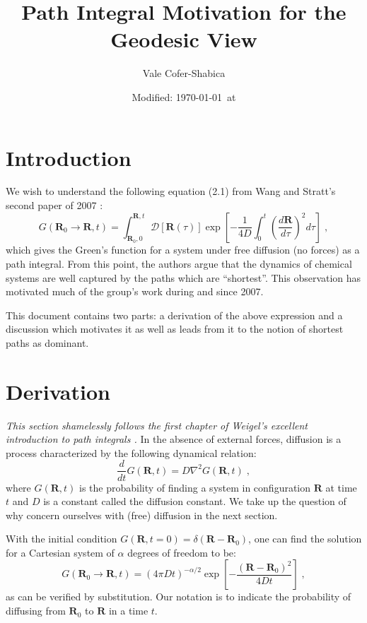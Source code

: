 \documentclass[letterpaper,12pt]{article}
\title{Path Integral Motivation for the Geodesic View}
\date{Modified: \today\ at \currenttime}
\author{Vale Cofer-Shabica}
\renewcommand{\vec}[1]{\mathbf{#1}}
\begin{document}
\maketitle


\section*{Introduction}
We wish to understand the following equation (2.1) from Wang and Stratt's second paper of 2007 \cite{wang:2007:geodesics}:
\begin{equation}
G(\vec{R}_{0} \to \vec{R} , t) = \int_{\vec{R}_{0},0}^{\vec{R},t} \mathscr{D} [\vec{R}(\tau)]\exp\left[ -\frac{1}{4D} \int_{0}^{t} {\left(\frac{d\vec{R}}{d\tau} \right)}^{2} d\tau\right] \;,
\end{equation}
which gives the Green's function for a system under free diffusion (no forces) as a path integral. From this point, the authors argue that the dynamics of chemical systems are well captured by the paths which are ``shortest''. This observation has  motivated much of the group's work during and since 2007.

This document contains two parts: a derivation of the above expression and a discussion which motivates it as well as leads from it to the notion of shortest paths as dominant.

\section*{Derivation}
\emph{This section shamelessly follows the first chapter of Weigel's excellent introduction to path integrals \cite{wiegel:1986}.}  In the absence of external forces, diffusion is a process characterized by the following dynamical relation:
\begin{equation}
\frac{d}{dt} G(\vec{R} , t) = D \nabla^{2} G(\vec{R} , t) \; ,
\end{equation}
where $G(\vec{R} , t)$ is the probability of finding a system in configuration $\vec{R}$ at time $t$ and $D$ is a constant called the diffusion constant. We take up the question of why concern ourselves with (free) diffusion in the next section.

With the initial condition $G(\vec{R}, t = 0) = \delta(\vec{R}- \vec{R}_{0})$, one can find the solution for a Cartesian system of $\alpha$ degrees of freedom to be:
\begin{equation} \label{eqn:gSoln}
G(\vec{R}_{0} \rightarrow \vec{R} , t) = (4\pi D t)^{-\alpha/2}\exp\left[ -\frac{(\vec{R} - \vec{R}_0)^2}{4Dt}\right] \; ,
\end{equation}
as can be verified by substitution. Our notation is to indicate the probability of diffusing from $\vec{R}_0$ to $\vec{R}$ in a time $t$.
\end{document}
